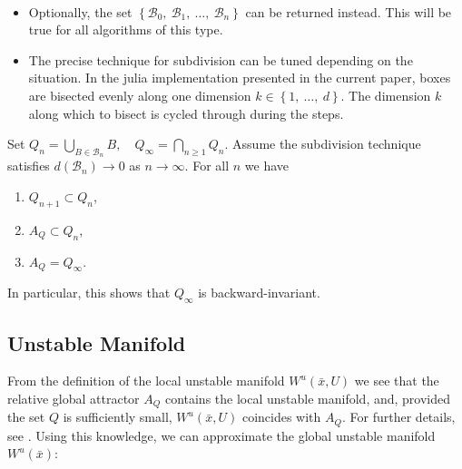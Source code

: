 \begin{remark}\
    \begin{itemize}
        \item Optionally, the set 
        $\left\{ \mathcal{B}_0,\ \mathcal{B}_1,\ \dotsc,\ \mathcal{B}_n \right\}$
        can be returned instead. This will be true for all algorithms of this type.
        \item The precise technique for subdivision can be tuned depending on the situation. 
        In the julia implementation presented in the current paper, boxes are bisected 
        evenly along one dimension $k \in \left\{1,\ \dotsc,\ d\right\}$. The dimension $k$ 
        along which to bisect is cycled through during the steps. \\
    \end{itemize}
\end{remark}

\begin{proposition}\label{thm:cover}
    \cite*{algGAIO,subalg} Set 
    $Q_n = \bigcup_{B \in \mathcal{B}_n} B,\quad Q_\infty = \bigcap_{n \geq 1} Q_n$. 
    Assume the subdivision technique satisfies $d(\mathcal{B}_n) \to 0$ as $n \to \infty$. 
    For all $n$ we have

    \begin{enumerate}
        \item $Q_{n+1} \subset Q_n$, 
        \item $A_Q \subset Q_n$, 
        \item $A_Q = Q_\infty$. 
    \end{enumerate}

    In particular, this shows that $Q_\infty$ is backward-invariant. 
\end{proposition}


\subsection{Unstable Manifold}

From the definition of the local unstable manifold $W^u(\bar{x}, U)$ we see that the 
relative global attractor $A_Q$ contains the local unstable manifold, and, provided the 
set $Q$ is sufficiently small, $W^u(\bar{x}, U)$ coincides with $A_Q$. For further 
details, see \cite*{manifold, geodynbook}. Using this knowledge, we can approximate the 
global unstable manifold $W^u(\bar{x})$: 

